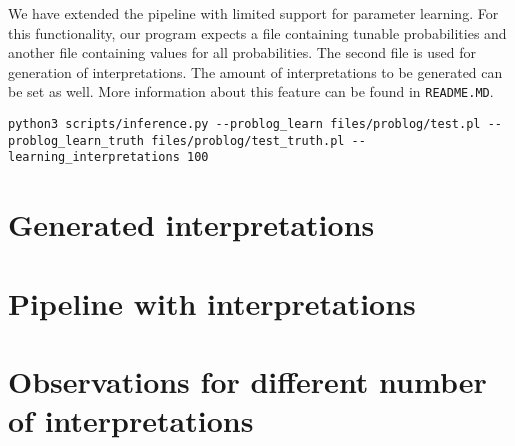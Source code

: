 We have extended the pipeline with limited support for parameter learning. For this functionality, our program expects a file containing tunable probabilities and another file containing values for all probabilities. The second file is used for generation of interpretations. The amount of interpretations to be generated can be set as well. More information about this feature can be found in \texttt{README.MD}.
\begin{lstlisting}
python3 scripts/inference.py --problog_learn files/problog/test.pl --problog_learn_truth files/problog/test_truth.pl --learning_interpretations 100
\end{lstlisting}

\section{Generated interpretations}
\section{Pipeline with interpretations}
\section{Observations for different number of interpretations}